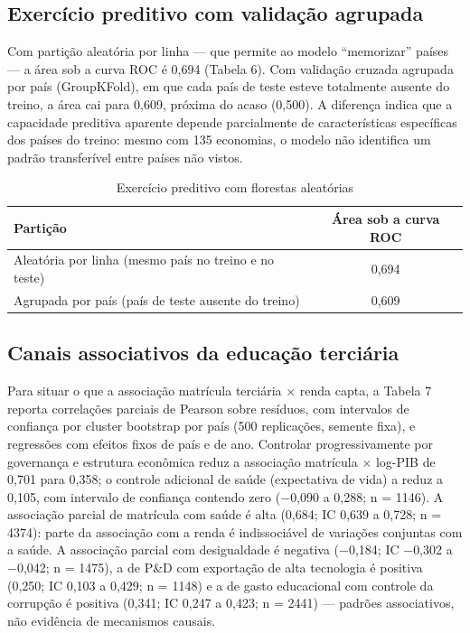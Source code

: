 \documentclass[12pt,a4paper]{article}
\begin{document}
\subsection{Exercício preditivo com validação agrupada}

Com partição aleatória por linha --- que permite ao modelo ``memorizar'' países --- a área sob a curva ROC é 0,694 (Tabela 6). Com validação cruzada agrupada por país (GroupKFold), em que cada país de teste esteve totalmente ausente do treino, a área cai para 0,609, próxima do acaso (0,500). A diferença indica que a capacidade preditiva aparente depende parcialmente de características específicas dos países do treino: mesmo com 135 economias, o modelo não identifica um padrão transferível entre países não vistos.

\begin{table}[htbp]
\centering
\caption{Exercício preditivo com florestas aleatórias}
\label{tab:ml}
\small
\begin{tabular}{lc}
\toprule
Partição & Área sob a curva ROC \\
\midrule
Aleatória por linha (mesmo país no treino e no teste) & 0,694 \\
Agrupada por país (país de teste ausente do treino) & 0,609 \\
\bottomrule
\end{tabular}
\par{}
\end{table}

\subsection{Canais associativos da educação terciária}

Para situar o que a associação matrícula terciária $\times$ renda capta, a Tabela 7 reporta correlações parciais de Pearson sobre resíduos, com intervalos de confiança por cluster bootstrap por país (500 replicações, semente fixa), e regressões com efeitos fixos de país e de ano. Controlar progressivamente por governança e estrutura econômica reduz a associação matrícula $\times$ log-PIB de 0,701 para 0,358; o controle adicional de saúde (expectativa de vida) a reduz a 0,105, com intervalo de confiança contendo zero ($-$0,090 a 0,288; n = 1146). A associação parcial de matrícula com saúde é alta (0,684; IC 0,639 a 0,728; n = 4374): parte da associação com a renda é indissociável de variações conjuntas com a saúde. A associação parcial com desigualdade é negativa ($-$0,184; IC $-$0,302 a $-$0,042; n = 1475), a de P\&D com exportação de alta tecnologia é positiva (0,250; IC 0,103 a 0,429; n = 1148) e a de gasto educacional com controle da corrupção é positiva (0,341; IC 0,247 a 0,423; n = 2441) --- padrões associativos, não evidência de mecanismos causais.
\end{document}
